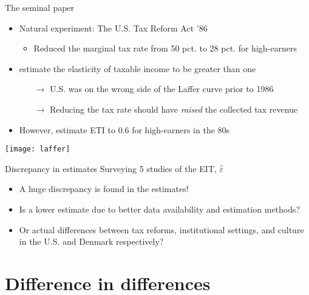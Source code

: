 \documentclass[8pt]{beamer}
\begin{document}
\begin{frame}{The seminal paper}
  \begin{itemize}
    \item Natural experiment: The U.S. Tax Reform Act '86
    \begin{itemize}
      \item Reduced the marginal tax rate from 50 pct. to 28 pct. for high-earners
    \end{itemize}
    \item \citet{feldstein1995effect} estimate the elasticity of taxable income to be greater than one
    \begin{itemize}
      \item[$\rightarrow$] U.S. was on the wrong side of the Laffer curve prior to 1986
      \item[$\rightarrow$] Reducing the tax rate should have \textit{raised} the collected tax revenue
    \end{itemize}
    \item However, \citet{gruber2002elasticity} estimate ETI to 0.6 for high-earners in the 80s
  \end{itemize}
    \centering\texttt{[image: laffer]}
\end{frame}

\begin{frame}{Discrepancy in estimates}
  Surveying 5 studies of the EIT, $\hat{\varepsilon}$
  \begin{itemize}
    \item A huge discrepancy is found in the estimates!
    \item Is a lower estimate due to better data availability and estimation methods?
    \item Or actual differences between tax reforms, institutional settings, and culture in the U.S. and Denmark respectively?
  \end{itemize}
    \begin{table}[h]
      \centering
      \footnotesize
        
    \end{table}
\end{frame}


\section{Difference in differences}
\end{document}
